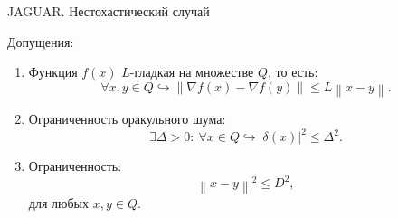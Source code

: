\documentclass{beamer}
\newcommand{\norms}[1]{\left\| #1 \right\|}
\begin{document}

\begin{frame}{JAGUAR. Нестохастический случай}

    Допущения:
        \begin{enumerate}
            \item Функция $f(x)$ $L$-гладкая на множестве $Q$, то есть: 
                \begin{equation*}
                    \forall x, y \in Q \hookrightarrow \left\|\nabla f(x) - \nabla f(y)\right\| \leq L \left\|x-y\right\|.
                \end{equation*}

            \item Ограниченность оракульного шума:
                \begin{equation*}
                    \exists \Delta > 0 : ~\forall x \in Q \hookrightarrow |\delta(x)|^2 \leq \Delta^2.
                \end{equation*}

            \item Ограниченность:
                \begin{equation*}
                    \norms{x- y}^2 \leq  D^2,
                \end{equation*}
                для любых $x,y \in Q$.
        \end{enumerate}

\end{frame}

\end{document}
